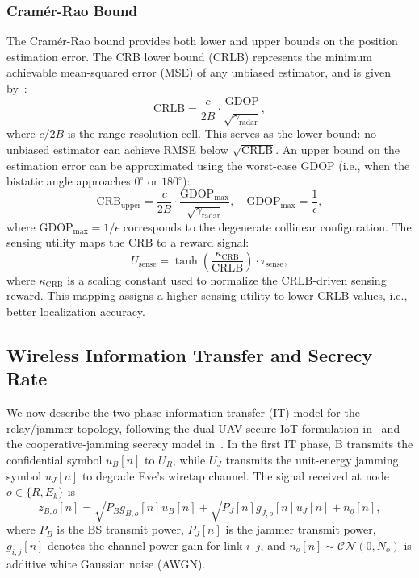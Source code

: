 \documentclass[journal]{IEEEtran}
\begin{document}
\subsubsection{Cram\'{e}r-Rao Bound}
The Cram\'{e}r-Rao bound provides both lower and upper bounds on the position estimation error. The CRB lower bound (CRLB) represents the minimum achievable mean-squared error (MSE) of any unbiased estimator, and is given by~\cite{zhang2023drlisac}:
\begin{equation}
\text{CRLB} = \frac{c}{2B} \cdot \frac{\text{GDOP}}{\sqrt{\gamma_{\text{radar}}}},
\label{eq:crb}
\end{equation}
where $c / 2B$ is the range resolution cell. This serves as the lower bound: no unbiased estimator can achieve RMSE below $\sqrt{\text{CRLB}}$. An upper bound on the estimation error can be approximated using the worst-case GDOP (i.e., when the bistatic angle approaches $0^\circ$ or $180^\circ$):
\begin{equation}
\text{CRB}_{\text{upper}} = \frac{c}{2B} \cdot \frac{\text{GDOP}_{\max}}{\sqrt{\gamma_{\text{radar}}}}, \quad \text{GDOP}_{\max} = \frac{1}{\epsilon},
\label{eq:crb_upper}
\end{equation}
where $\text{GDOP}_{\max} = 1/\epsilon$ corresponds to the degenerate collinear configuration. The sensing utility maps the CRB to a reward signal:
\begin{equation}
U_{\text{sense}} = \tanh\left(\frac{\kappa_{\text{CRB}}}{\text{CRLB}}\right) \cdot \tau_{\text{sense}},
\label{eq:sense_util}
\end{equation}
where $\kappa_{\text{CRB}}$ is a scaling constant used to normalize the CRLB-driven sensing reward. This mapping assigns a higher sensing utility to lower CRLB values, i.e., better localization accuracy.

\subsection{Wireless Information Transfer and Secrecy Rate}
We now describe the two-phase information-transfer (IT) model for the relay/jammer topology, following the dual-UAV secure IoT formulation in~\cite{pandeydualuav2026} and the cooperative-jamming secrecy model in~\cite{pandeyswiptjam2025}. In the first IT phase, B transmits the confidential symbol $u_B[n]$ to $U_R$, while $U_J$ transmits the unit-energy jamming symbol $u_J[n]$ to degrade Eve's wiretap channel. The signal received at node $o\in\{R,E_k\}$ is
\begin{equation}
z_{B,o}[n]=\sqrt{P_B g_{B,o}[n]}u_B[n]+\sqrt{P_J[n]g_{J,o}[n]}u_J[n]+n_o[n],
\label{eq:rx_phase1}
\end{equation}
where $P_B$ is the BS transmit power, $P_J[n]$ is the jammer transmit power, $g_{i,j}[n]$ denotes the channel power gain for link $i$--$j$, and $n_o[n]\sim\mathcal{CN}(0,N_o)$ is additive white Gaussian noise (AWGN).
\end{document}
